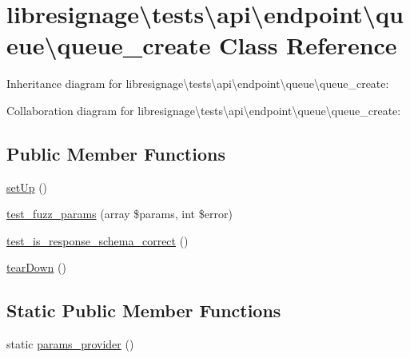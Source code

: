 \hypertarget{classlibresignage_1_1tests_1_1api_1_1endpoint_1_1queue_1_1queue__create}{}\section{libresignage\textbackslash{}tests\textbackslash{}api\textbackslash{}endpoint\textbackslash{}queue\textbackslash{}queue\+\_\+create Class Reference}
\label{classlibresignage_1_1tests_1_1api_1_1endpoint_1_1queue_1_1queue__create}


Inheritance diagram for libresignage\textbackslash{}tests\textbackslash{}api\textbackslash{}endpoint\textbackslash{}queue\textbackslash{}queue\+\_\+create\+:


Collaboration diagram for libresignage\textbackslash{}tests\textbackslash{}api\textbackslash{}endpoint\textbackslash{}queue\textbackslash{}queue\+\_\+create\+:
\subsection*{Public Member Functions}
\begin{DoxyCompactItemize}
\item 
\hyperlink{classlibresignage_1_1tests_1_1api_1_1endpoint_1_1queue_1_1queue__create_ad4c979af02534fa05084c3c9c7e324b6}{set\+Up} ()
\item 
\hyperlink{classlibresignage_1_1tests_1_1api_1_1endpoint_1_1queue_1_1queue__create_a61e6804d93b8250d08414ea7734b2979}{test\+\_\+fuzz\+\_\+params} (array \$params, int \$error)
\item 
\hyperlink{classlibresignage_1_1tests_1_1api_1_1endpoint_1_1queue_1_1queue__create_a21514dc98ba52292b5b9ed01f624af6b}{test\+\_\+is\+\_\+response\+\_\+schema\+\_\+correct} ()
\item 
\hyperlink{classlibresignage_1_1tests_1_1api_1_1endpoint_1_1queue_1_1queue__create_a40e89aa5433a10f7b4724157b8c5009c}{tear\+Down} ()
\end{DoxyCompactItemize}
\subsection*{Static Public Member Functions}
\begin{DoxyCompactItemize}
\item 
static \hyperlink{classlibresignage_1_1tests_1_1api_1_1endpoint_1_1queue_1_1queue__create_aa59a40a8706cad50c11c5775fdca6626}{params\+\_\+provider} ()
\end{DoxyCompactItemize}
